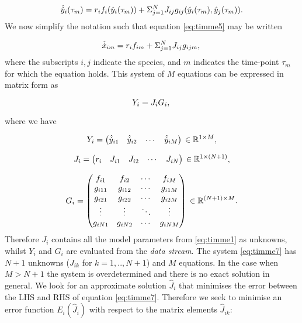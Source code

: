 \begin{equation}\label{eq:timme5}
\hat{\dot{y}}_{i}(\tau_m) = r_if_{i}(\hat{y}_i(\tau_m)) + \Sigma_{j=1}^{N}J_{ij}g_{ij}(\hat{y}_i(\tau_m), \hat{y}_j(\tau_m)).\\
\end{equation}
%
We now simplify the notation such that equation \eqref{eq:timme5} may be written 

\begin{equation}\label{eq:timme6}
\hat{\dot{x}}_{im} = r_if_{im} + \Sigma_{j=1}^{N}J_{ij}g_{ijm},\\
\end{equation}
%
where the subscripts  $i,j$ indicate the species, and $m$ indicates the time-point $\tau_m$ for which the equation holds. This system of $M$ equations can be expressed in matrix form as

\begin{equation}\label{eq:timme7}
Y_{i} = J_iG_i,\\
\end{equation}

where we have

\begin{equation}\label{eq:timme8}
Y_{i} = 
\begin{pmatrix}
  \hat{\dot{y}}_{i1} & \hat{\dot{y}}_{i2} & \cdots & \hat{\dot{y}}_{iM}
\end{pmatrix}\\
\in{\mathbb{R}^{1 \times M}},
\end{equation}

\begin{equation}\label{eq:timme9}
J_{i} = 
\begin{pmatrix}
  r_i & J_{i1} & J_{i2} & \cdots & J_{iN}
\end{pmatrix}\\
\in{\mathbb{R}^{1 \times(N+1)}},
\end{equation}

\begin{equation}\label{eq:timme10}
G_{i} = 
\begin{pmatrix}
  f_{i1}  &    f_{i2} & \cdots & f_{iM}         \\
  g_{i11} & g_{i12} & \cdots & g_{i1M} \\
  g_{i21} & g_{i22} & \cdots & g_{i2M} \\
  \vdots    & \vdots    & \ddots & \vdots    \\
  g_{iN1} & g_{iN2} & \cdots & g_{iNM} \\
\end{pmatrix}\\
\in{\mathbb{R}^{(N+1)\times M}}.
\end{equation}
%
Therefore $J_i$ contains all the model parameters from \eqref{eq:timme1} as unknowns, whilst $Y_i$ and $G_i$ are evaluated from the \emph{data stream}. The system \eqref{eq:timme7} has $N+1$ unknowns ($J_{ik}$ for $k=1,..,N+1$) and $M$ equations. In the case when $M>N+1$ the system is overdetermined and there is no exact solution in general. We look for an approximate solution $\hat{J}_i$ that minimises the error between the LHS and RHS of equation \eqref{eq:timme7}. Therefore we seek to minimise an error function $E_i(\hat{J}_i)$ with respect to the matrix elements $\hat{J}_{ik}$:

